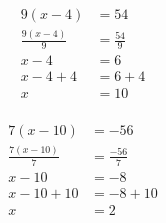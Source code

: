 \documentclass[12pt]{article}
\newcounter{minipagecount}
\begin{document}
\begin{multicols}{2}
\begin{minipage}[t]{0.45\textwidth}
    \raggedright %
    \begin{align*} %
        9(x - 4) &= 54\\
        \frac{9(x-4)}{9} &= \frac{54}{9}\\
        x - 4 &= 6\\
        x - 4 + 4 &= 6 + 4\\
        x &= 10\\
    \end{align*}
\end{minipage} %
\noindent{(\theminipagecount)}\hspace{0.1mm} %
\begin{minipage}[t]{0.45\textwidth} %
    \vspace{-26pt}  %
    \raggedright %
    \begin{align*} %
        7(x - 10) &= -56\\
        \frac{7(x-10)}{7} &= \frac{-56}{7}\\
        x - 10 &= -8\\
        x - 10 + 10 &= -8 + 10\\
        x &= 2\\
    \end{align*}
\end{minipage} %
\noindent{(\theminipagecount)}\hspace{0.1mm} %
\begin{minipage}[t]{0.45\textwidth} %
    \vspace{-26pt}  %

\end{minipage}
\end{multicols}
\end{document}

